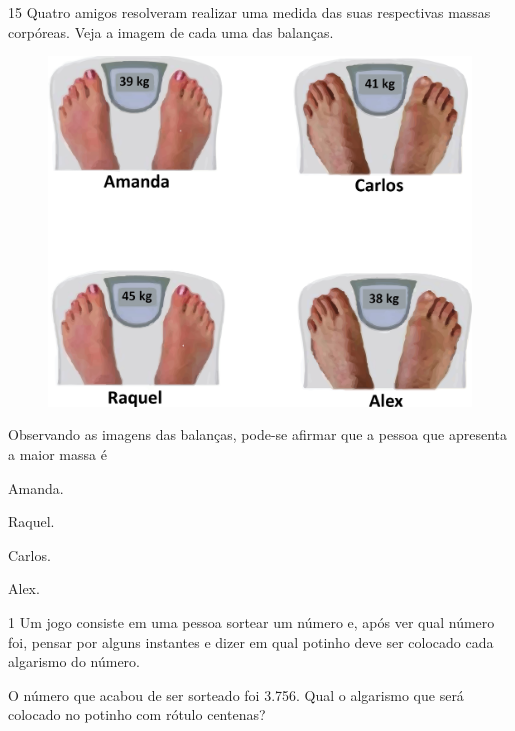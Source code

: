 \num{15} Quatro amigos resolveram realizar uma medida das suas respectivas massas corpóreas. Veja a imagem de cada uma das balanças.

\begin{figure}[htpb!]
\centering
\includegraphics[width=.8\textwidth]{./media/image113.png}
\end{figure}

Observando as imagens das balanças, pode-se afirmar que a pessoa que apresenta a maior massa é

\begin{escolha}
\item
  Amanda.
\item
  Raquel.
\item
  Carlos.
\item
  Alex.
\end{escolha}
\pagebreak

\vspace*{-3.4cm}

\pagebreak

\num{1} Um jogo consiste em uma pessoa sortear um número e, após ver qual número foi, pensar por alguns instantes e dizer em qual potinho deve ser colocado cada algarismo do número.


O número que acabou de ser sorteado foi 3.756. Qual o algarismo que será colocado no potinho com rótulo centenas?

